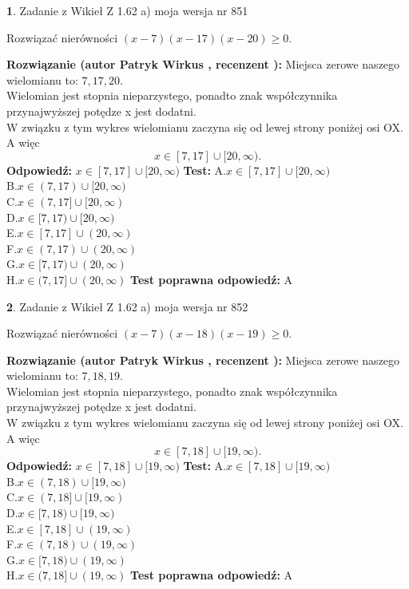 \documentclass[12pt, a4paper]{article}
\theoremstyle{definition} %
\newtheorem{zad}{}
\newcommand{\zadStart}[1]{\begin{zad}#1\newline}
\newcommand{\zadStop}{\end{zad}}
\newcommand{\rozwStart}[2]{\noindent \textbf{Rozwiązanie (autor #1 , recenzent #2): }\newline}
\newcommand{\rozwStop}{\newline}
\newcommand{\odpStart}{\noindent \textbf{Odpowiedź:}\newline}
\newcommand{\odpStop}{\newline}
\newcommand{\testStart}{\noindent \textbf{Test:}\newline}
\newcommand{\testStop}{\newline}
\newcommand{\kluczStart}{\noindent \textbf{Test poprawna odpowiedź:}\newline}
\newcommand{\kluczStop}{\newline}
\begin{document}
\zadStart{Zadanie z Wikieł Z 1.62 a) moja wersja nr 851}

Rozwiązać nierówności $(x-7)(x-17)(x-20)\ge0$.
\zadStop
\rozwStart{Patryk Wirkus}{}
Miejsca zerowe naszego wielomianu to: $7, 17, 20$.\\
Wielomian jest stopnia nieparzystego, ponadto znak współczynnika przy\linebreak najwyższej potędze x jest dodatni.\\ W związku z tym wykres wielomianu zaczyna się od lewej strony poniżej osi OX. A więc $$x \in [7,17] \cup [20,\infty).$$
\rozwStop
\odpStart
$x \in [7,17] \cup [20,\infty)$
\odpStop
\testStart
A.$x \in [7,17] \cup [20,\infty)$\\
B.$x \in (7,17) \cup [20,\infty)$\\
C.$x \in (7,17] \cup [20,\infty)$\\
D.$x \in [7,17) \cup [20,\infty)$\\
E.$x \in [7,17] \cup (20,\infty)$\\
F.$x \in (7,17) \cup (20,\infty)$\\
G.$x \in [7,17) \cup (20,\infty)$\\
H.$x \in (7,17] \cup (20,\infty)$
\testStop
\kluczStart
A
\kluczStop



\zadStart{Zadanie z Wikieł Z 1.62 a) moja wersja nr 852}

Rozwiązać nierówności $(x-7)(x-18)(x-19)\ge0$.
\zadStop
\rozwStart{Patryk Wirkus}{}
Miejsca zerowe naszego wielomianu to: $7, 18, 19$.\\
Wielomian jest stopnia nieparzystego, ponadto znak współczynnika przy\linebreak najwyższej potędze x jest dodatni.\\ W związku z tym wykres wielomianu zaczyna się od lewej strony poniżej osi OX. A więc $$x \in [7,18] \cup [19,\infty).$$
\rozwStop
\odpStart
$x \in [7,18] \cup [19,\infty)$
\odpStop
\testStart
A.$x \in [7,18] \cup [19,\infty)$\\
B.$x \in (7,18) \cup [19,\infty)$\\
C.$x \in (7,18] \cup [19,\infty)$\\
D.$x \in [7,18) \cup [19,\infty)$\\
E.$x \in [7,18] \cup (19,\infty)$\\
F.$x \in (7,18) \cup (19,\infty)$\\
G.$x \in [7,18) \cup (19,\infty)$\\
H.$x \in (7,18] \cup (19,\infty)$
\testStop
\kluczStart
A
\kluczStop
\end{document}
